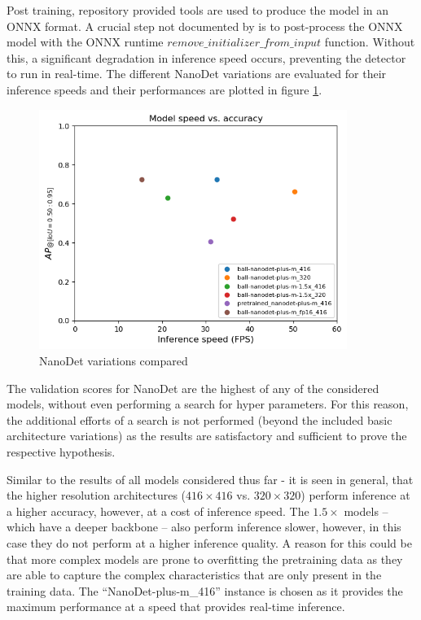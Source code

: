 \documentclass[a4paper,twoside,12pt]{report}
\begin{document}
Post training, repository provided tools are used to produce the model in an ONNX format. A crucial step not documented by \cite{nanodet} is to post-process the ONNX model with the ONNX runtime $remove\_initializer\_from\_input$ function. Without this, a significant degradation in inference speed occurs, preventing the detector to run in real-time. The different NanoDet variations are evaluated for their inference speeds and their performances are plotted in figure \ref{fig:nanodet_compare}.

\begin{figure}[h!]
\begin{center}
\includegraphics[width=10cm]{images/nanodet_compare.png}
\caption{NanoDet variations compared}
\label{fig:nanodet_compare}
\end{center}
\end{figure}

The validation scores for NanoDet are the highest of any of the considered models, without even performing a search for hyper parameters. For this reason, the additional efforts of a search is not performed (beyond the included basic architecture variations) as the results are satisfactory and sufficient to prove the respective hypothesis. 

Similar to the results of all models considered thus far - it is seen in general, that the higher resolution architectures ($416 \times 416$ vs. $320 \times 320$) perform inference at a higher accuracy, however, at a cost of inference speed. The $1.5\times$ models -- which have a deeper backbone -- also perform inference slower, however, in this case they do not perform at a higher inference quality. A reason for this could be that more complex models are prone to overfitting the pretraining data as they are able to capture the complex characteristics that are only present in the training data. The ``NanoDet-plus-m\_416'' instance is chosen as it provides the maximum performance at a speed that provides real-time inference.
\end{document}
